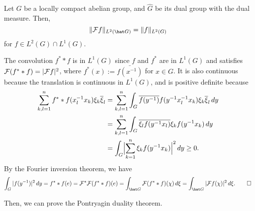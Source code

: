 \documentclass[a4paper]{article}
\begin{document}
\begin{thm}
Let $G$ be a locally compact abelian group, and $\hat G$ be its dual group with the dual measure.
Then,
\[\|\cF f\|_{L^2(\hat G)}=\|f\|_{L^2(G)}\]
for $f\in L^2(G)\cap L^1(G)$.
\end{thm}
\begin{pf}
The convolution $f^**f$ is in $L^1(G)$ since $f$ and $f^*$ are in $L^1(G)$ and satisfies $\cF(f^**f)=|\cF f|^2$, where $f^*(x):=\bar{f(x^{-1})}$ for $x\in G$.
It is also continuous because the translation is continuous in $L^1(G)$, and is positive definite because
\begin{align*}
\sum_{k,l=1}^nf^**f(x_l^{-1}x_k)\xi_k\bar\xi_l
&=\sum_{k,l=1}^n\int_G\bar{f(y^{-1})}f(y^{-1}x_l^{-1}x_k)\xi_k\bar\xi_l\,dy\\
&=\sum_{k,l=1}^n\int_G\bar{\xi_lf(y^{-1}x_l)}\xi_kf(y^{-1}x_k)\,dy\\
&=\int_G\Bigl|\sum_{k=1}^n\xi_kf(y^{-1}x_k)\Bigr|^2\,dy\ge0.
\end{align*}
By the Fourier inversion theorem, we have
\[\int_G|f(y^{-1})|^2\,dy=f^**f(e)=\cF^*\cF(f^**f)(e)=\int_{\hat G}\cF(f^**f)(\chi)\,d\xi=\int_{\hat G}|\cF f(\chi)|^2\,d\xi.\qedhere\]
\end{pf}

Then, we can prove the Pontryagin duality theorem.
\end{document}
